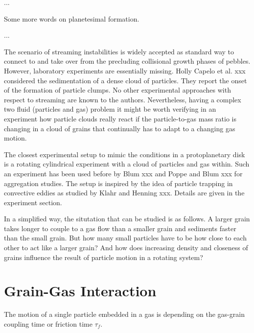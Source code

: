 ...

Some more words on planetesimal formation.

...

The scenario of streaming instabilities is widely accepted as standard way to connect to and take over from the precluding collisional growth phases of pebbles. However, laboratory experiments are essentially missing. Holly Capelo et al. xxx considered the sedimentation of a dense cloud of particles. They report the onset of the formation of 
particle clumps. No other experimental approaches with respect to streaming are known to the authors. 
Nevertheless, having a complex two fluid (particles and gas) problem it might be worth
verifying in an experiment how particle clouds really react if the particle-to-gas mass ratio is changing in a cloud of grains that continually has to adapt to a changing gas motion.

The closest experimental setup to mimic the conditions in a protoplanetary disk is
a rotating cylindrical experiment with a cloud of particles and gas within.
Such an experiment has been used before by Blum xxx and Poppe and Blum xxx for 
aggregation studies. The setup is inspired by the idea of particle trapping in convective eddies as studied by Klahr and Henning xxx. Details are given in the experiment section.


In a simplified way, the situtation that can be studied is as follows.
A larger grain takes longer to couple to a gas flow than a smaller grain and 
sediments faster than the small grain.
But how many small particles have to be how close to each other to act like a larger grain?
And how does increasing density and closeness of grains influence the result of particle motion in a rotating system?

\section{Grain-Gas Interaction}

The motion of a single particle embedded in a gas is depending on the
gas-grain coupling time or friction time $\tau_f$. 




